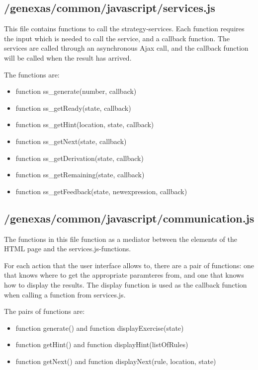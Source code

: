 \documentclass{article}
\begin{document}
\subsection{/genexas/common/javascript/services.js}
This file contains functions to call the strategy-services. Each function requires the input which is needed to call the service, and a callback function. The services are called through an asynchronous Ajax call, and the callback function will be called when the result has arrived.

The functions are:
\begin{itemize}
\item function ss\_generate(number, callback) 
\item function ss\_getReady(state, callback) 
\item function ss\_getHint(location, state, callback) 
\item function ss\_getNext(state, callback)
\item function ss\_getDerivation(state, callback)
\item function ss\_getRemaining(state, callback) 
\item function ss\_getFeedback(state, newexpression, callback)
\end{itemize}

\subsection{/genexas/common/javascript/communication.js}
The functions in this file function as a mediator between the elements of the HTML page and the services.js-functions. 

For each action that the user interface allows to, there are a pair of functions: one that knows where to get the appropriate paramteres from, and one that knows how to display the results. The display function is used as the callback function when calling a function from services.js.

The pairs of functions are:

\begin{itemize}
\item function generate() and function displayExercise(state)
\item function getHint() and function displayHint(listOfRules)
\item function getNext() and  function displayNext(rule, location, state) 
\end{itemize}
\end{document}
